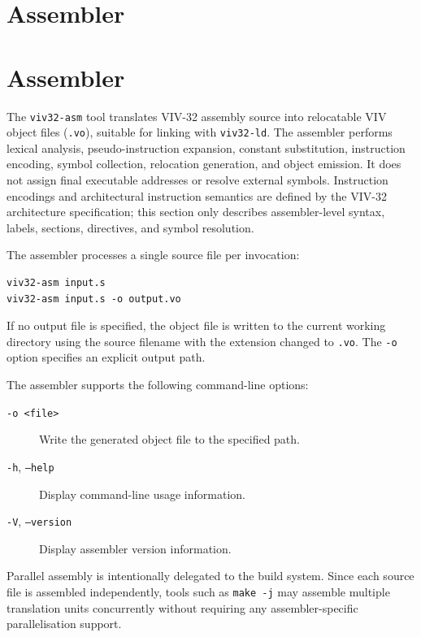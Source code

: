 \section{Assembler}
\label{sec:toolchain-assembler}

\section{Assembler}

The \texttt{viv32-asm} tool translates VIV-32 assembly source into relocatable VIV
object files (\texttt{.vo}), suitable for linking with \texttt{viv32-ld}.
The assembler performs lexical analysis, pseudo-instruction
expansion, constant substitution, instruction encoding, symbol collection, relocation
generation, and object emission. It does not assign final executable addresses or
resolve external symbols.
Instruction encodings and architectural instruction semantics are defined by the VIV-32
architecture specification; this section only describes assembler-level syntax, labels,
sections, directives, and symbol resolution.

The assembler processes a single source file per invocation:

\begin{verbatim}
viv32-asm input.s
viv32-asm input.s -o output.vo
\end{verbatim}

If no output file is specified, the object file is written to the current working
directory using the source filename with the extension changed to \texttt{.vo}. The
\texttt{-o} option specifies an explicit output path.

The assembler supports the following command-line options:

\begin{description}
    \item[\texttt{-o <file>}] Write the generated object file to the specified path.
    \item[\texttt{-h}, \texttt{--help}] Display command-line usage information.
    \item[\texttt{-V}, \texttt{--version}] Display assembler version information.
\end{description}

Parallel assembly is intentionally delegated to the build system. Since each source
file is assembled independently, tools such as \texttt{make -j} may assemble multiple
translation units concurrently without requiring any assembler-specific parallelisation
support.

